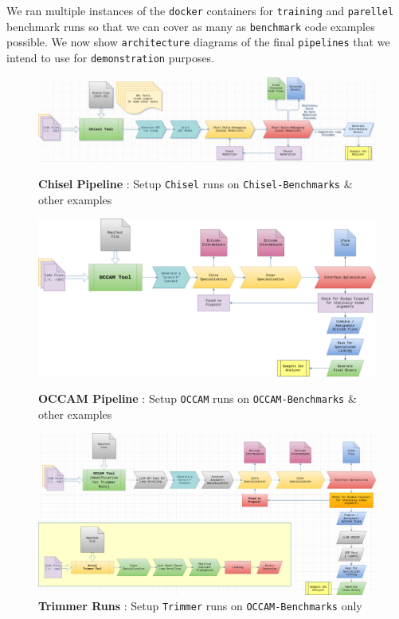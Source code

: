 \documentclass{relatorio}
\begin{document}
We ran multiple instances of the \texttt{docker} containers for \texttt{training} and \texttt{parellel} benchmark runs so that we can cover as many as \texttt{benchmark} code examples possible. We now show \texttt{architecture} diagrams of the final \texttt{pipelines} that we intend to use for \texttt{demonstration} purposes. 

\onecolumn
\begin{figure}[H]
	\centering
	\captionsetup{justification=centering}
	\includegraphics[width=1\linewidth]{imgs/chisel-pipeline.png}
	\caption{\textbf{Chisel Pipeline} : Setup \texttt{Chisel} runs on \texttt{Chisel-Benchmarks} \& other examples}%
	\label{fig:plant}
	\centering
	\captionsetup{justification=centering}
	\includegraphics[width=1\linewidth]{imgs/occam-pipeline.png}
	\caption{\textbf{OCCAM Pipeline} : Setup \texttt{OCCAM} runs on \texttt{OCCAM-Benchmarks} \& other examples}%
	\label{fig:plant}
	\centering
	\captionsetup{justification=centering}
	\includegraphics[width=1\linewidth]{imgs/occam-modified-trimmer.png}
	\caption{\textbf{Trimmer Runs} : Setup \texttt{Trimmer} runs on \texttt{OCCAM-Benchmarks} only}%
	\label{fig:plant}
\end{figure}
\twocolumn
\end{document}
